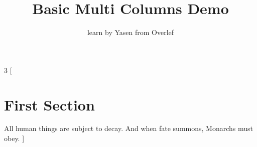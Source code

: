 \documentclass[]{article}
\title{Basic Multi Columns Demo}
\author{learn by Yasen from Overlef}
\begin{document}
	
	\maketitle
	
	\begin{multicols*}{3}
		[
		\section{First Section}
		All human things are subject to decay. And when fate summons, Monarchs must obey.
		]
		\blindtext\blindtext
	\end{multicols*}
	
\end{document}
